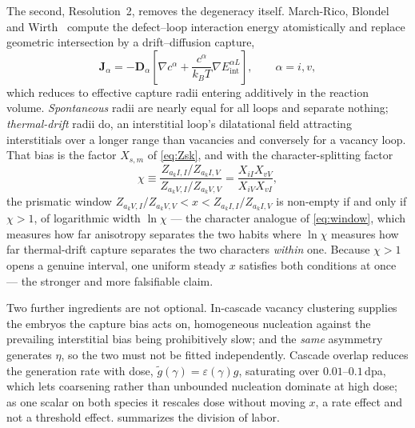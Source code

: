 The second, Resolution~2, removes the degeneracy itself. March-Rico, Blondel and
Wirth~\citep{marchrico2025} compute the defect--loop interaction energy
atomistically and replace geometric intersection by a drift--diffusion capture,
\begin{equation}
  \bm J_\alpha=-\bm D_\alpha\left[\nabla c^{\alpha}
    +\frac{c^{\alpha}}{k_BT}\nabla E^{\alpha L}_{\mathrm{int}}\right],
  \qquad \alpha=i,v,
  \label{eq:drift-diffusion}
\end{equation}
which reduces to effective capture radii entering additively in the reaction
volume. \emph{Spontaneous} radii are nearly equal for all loops and separate
nothing; \emph{thermal-drift} radii do, an interstitial loop's dilatational
field attracting interstitials over a longer range than vacancies and conversely
for a vacancy loop. That bias is the factor $X_{s,m}$ of \cref{eq:Zsk}, and
with the character-splitting factor
\begin{equation}
  \chi\equiv
  \frac{Z_{a_kI,I}/Z_{a_kI,V}}{Z_{a_kV,I}/Z_{a_kV,V}}
  =\frac{X_{iI}X_{vV}}{X_{iV}X_{vI}},
  \label{eq:chi}
\end{equation}
the prismatic window $Z_{a_kV,I}/Z_{a_kV,V}<x<Z_{a_kI,I}/Z_{a_kI,V}$ is
non-empty if and only if $\chi>1$, of logarithmic width $\ln\chi$ --- the
character analogue of \cref{eq:window}, which measures how far anisotropy
separates the two habits where $\ln\chi$ measures how far thermal-drift capture
separates the two characters \emph{within} one. Because $\chi>1$ opens a genuine
interval, one uniform steady $x$ satisfies both conditions at once --- the
stronger and more falsifiable claim.

Two further ingredients are not optional. In-cascade vacancy clustering supplies
the embryos the capture bias acts on, homogeneous nucleation against the
prevailing interstitial bias being prohibitively slow; and the
\emph{same} asymmetry generates $\eta$, so the two must not be fitted
independently. Cascade overlap reduces the generation rate with dose,
$\tilde g(\gamma)=\varepsilon(\gamma)g$, saturating over $0.01$--$0.1\,$dpa,
which lets coarsening rather than unbounded nucleation dominate at high dose; as
one scalar on both species it rescales dose without moving $x$, a rate effect
and not a threshold effect.  summarizes the division of
labor.

